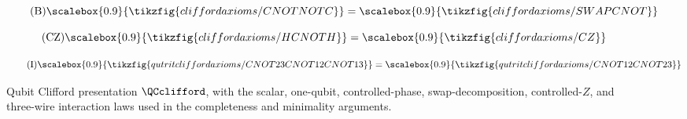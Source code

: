 \begin{figure}[ht]
{\begin{minipage}{0.975\linewidth}
\begin{minipage}[c]{0.32\linewidth}
\begin{equation}
      \end{equation}
    \end{minipage}\vspace{-0.6em}
    \begin{minipage}[c]{0.29\linewidth}\centering
      \begin{equation}\tag{B}\label{B}
        \scalebox{0.9}{\tikzfig{cliffordaxioms/CNOTNOTC}} = \scalebox{0.9}{\tikzfig{cliffordaxioms/SWAPCNOT}}
      \end{equation}
    \end{minipage}%
    \begin{minipage}[c]{0.47\linewidth}\centering
      \begin{equation}\tag{CZ}\label{CZ}
        \scalebox{0.9}{\tikzfig{cliffordaxioms/HCNOTH}} = \scalebox{0.9}{\tikzfig{cliffordaxioms/CZ}}
      \end{equation}
    \end{minipage}\vspace{-0.6em}
    \begin{minipage}[c]{0.29\linewidth}\centering
      \begin{equation}\tag{I}\label{Inew}
        \scalebox{0.9}{\tikzfig{qutritcliffordaxioms/CNOT23CNOT12CNOT13}} = \scalebox{0.9}{\tikzfig{qutritcliffordaxioms/CNOT12CNOT23}}
      \end{equation}
    \end{minipage}
    \end{minipage}}
    \caption{Qubit Clifford presentation \(\QCclifford\), with the scalar, one-qubit, controlled-phase, swap-decomposition, controlled-\(Z\), and three-wire interaction laws used in the completeness and minimality arguments.}
    \label{fig:qubitcliffordaxioms}
\end{figure}
